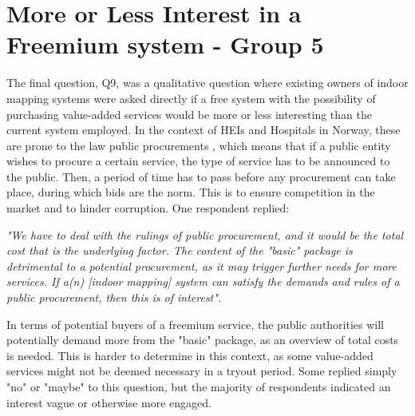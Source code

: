 \section{More or Less Interest in a Freemium system - Group 5}
The final question, Q9, was a qualitative question where existing owners of indoor mapping systems were asked directly if a free system with the possibility of purchasing value-added services would be more or less interesting than the current system employed. In the context of HEIs and Hospitals in Norway, these are prone to the law public procurements \cite{procurement}, which means that if a public entity wishes to procure a certain service, the type of service has to be announced to the public. Then, a period of time has to pass before any procurement can take place, during which bids are the norm. This is to ensure competition in the market and to hinder corruption. One respondent replied:
\begin{displayquote}
\textit{"We have to deal with the rulings of public procurement, and it would be the total cost that is the underlying factor. The content of the "basic" package is detrimental to a potential procurement, as it may trigger further needs for more services. If a(n) [indoor mapping] system can satisfy the demands and rules of a public procurement, then this is of interest".}
\end{displayquote}
In terms of potential buyers of a freemium service, the public authorities will potentially demand more from the "basic" package, as an overview of total costs is needed. This is harder to determine in this context, as some value-added services might not be deemed necessary in a tryout period.
Some replied simply "no" or "maybe" to this question, but the majority of respondents indicated an interest vague or otherwise more engaged. 